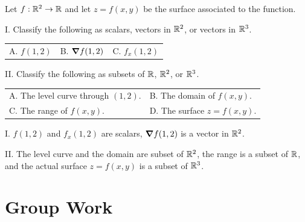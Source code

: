 \documentclass[noauthor,handout]{ximera}
\begin{document}

\begin{problem}
Let $f:\mathbb R^2 \to \mathbb R$ and let $z=f(x,y)$ be the surface associated to the function.

I. Classify the following as scalars, vectors in $\mathbb R^2$, or vectors in $\mathbb R^3$.

\begin{center}
\begin{tabular}{lll}
A. $f(1,2)$ \qquad \qquad \qquad & B. $\boldsymbol\nabla{f}(1,2)$  \qquad \qquad \qquad & C. $f_x(1,2)$ 
\end{tabular}
\end{center}

II. Classify the following as subsets of $\mathbb R$, $\mathbb R^2$, or $\mathbb R^3$.

\begin{center}
\begin{tabular}{ll}
A. The level curve through $(1,2)$. \qquad \qquad & B. The domain of $f(x,y)$. \\
C. The range of $f(x,y)$. & D. The surface $z=f(x,y)$. 
\end{tabular}
\end{center}

\begin{freeResponse}
I. $f(1,2)$ and $f_x(1,2)$ are scalars, $\boldsymbol\nabla{f}(1,2)$ is a vector in $\mathbb R^2$.

II. The level curve and the domain are subset of $\mathbb R^2$, the range is a subset of $\mathbb R$, and the actual surface $z=f(x,y)$ is a subset of $\mathbb R^3$.

\end{freeResponse}
\end{problem}


\section{Group Work}
\end{document}
